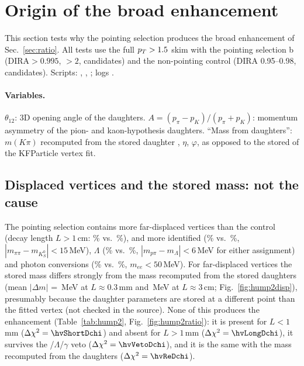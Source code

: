 \section{Origin of the broad enhancement}
\label{sec:hump}

This section tests why the pointing selection produces the broad enhancement of Sec.~\ref{sec:ratio}. All tests use the
full $p_T>1.5$ skim with the pointing selection b (DIRA$>0.995$, \Ls$>2$, \humpNsig{} candidates) and the non-pointing
control (DIRA 0.95--0.98, \humpNctl{} candidates). Scripts: , ,
; logs .

\paragraph{Variables.} $\theta_{12}$: 3D opening angle of the daughters. $A=(p_\pi-p_K)/(p_\pi+p_K)$: momentum asymmetry
of the pion- and kaon-hypothesis daughters. ``Mass from daughters'': $m(K\pi)$ recomputed from the stored daughter \pt,
$\eta$, $\varphi$, as opposed to the stored  of the KFParticle vertex fit.

\subsection*{Displaced vertices and the stored mass: not the cause}
The pointing selection contains more far-displaced vertices than the control (decay length $L>1$\,cm: \hcompLlongS\% vs.\
\hcompLlongC\%), and more identified \Ks{} (\hcompKsS\% vs.\ \hcompKsC\%, $|m_{\pi\pi}-m_{K^0_S}|<15$\,MeV), $\Lambda$
(\hcompLamS\% vs.\ \hcompLamC\%, $|m_{p\pi}-m_\Lambda|<6$\,MeV for either assignment) and photon conversions
(\hcompGamS\% vs.\ \hcompGamC\%, $m_{ee}<50$\,MeV). For far-displaced vertices the stored mass differs strongly from the
mass recomputed from the stored daughters (mean $|\Delta m|$ = \hdmShort\,MeV at $L\approx0.3$\,mm and \hdmLong\,MeV at $L\approx3$\,cm; Fig.~\ref{fig:hump2disp}), presumably because the daughter parameters are
stored at a different point than the fitted vertex (not checked in the source). None of this produces the enhancement
(Table~\ref{tab:hump2}, Fig.~\ref{fig:hump2ratio}): it is present for $L<1$\,mm ($\Delta\chi^2=\hvShortDchi$) and absent for
$L>1$\,mm ($\Delta\chi^2=\hvLongDchi$), it survives the \Ks/$\Lambda$/$\gamma$ veto ($\Delta\chi^2=\hvVetoDchi$), and it is
the same with the mass recomputed from the daughters ($\Delta\chi^2=\hvReDchi$).

